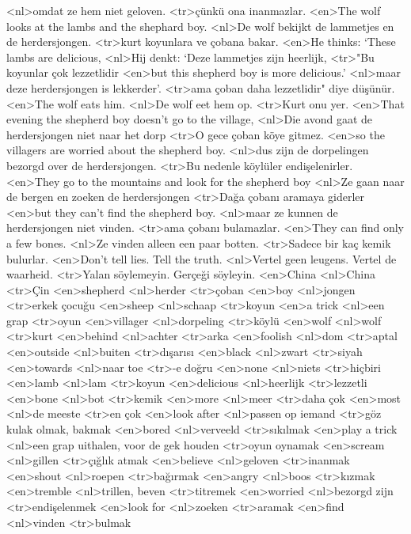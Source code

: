 <nl>omdat ze hem niet geloven.
<tr>çünkü ona inanmazlar.
<en>The wolf looks at the lambs and the shephard boy.
<nl>De wolf bekijkt de lammetjes en de herdersjongen. 
<tr>kurt koyunlara ve çobana bakar.
<en>He thinks: `These lambs are delicious,
<nl>Hij denkt: `Deze lammetjes zijn heerlijk, 
<tr>"Bu koyunlar çok lezzetlidir 
<en>but this shepherd boy is more delicious.'
<nl>maar deze herdersjongen is lekkerder'.
<tr>ama çoban daha lezzetlidir" diye düşünür.
<en>The wolf eats him.
<nl>De wolf eet hem op.
<tr>Kurt onu yer.
<en>That evening the shepherd boy doesn’t go to the village,
<nl>Die avond gaat de herdersjongen niet naar het dorp
<tr>O gece çoban köye gitmez.
<en>so  the villagers are worried about the shepherd boy.
<nl>dus zijn de dorpelingen bezorgd over de herdersjongen. 
<tr>Bu nedenle köylüler endişelenirler.
<en>They go to the mountains and look for the shepherd boy
<nl>Ze gaan naar de bergen en zoeken de herdersjongen 
<tr>Dağa çobanı aramaya giderler
<en>but they can’t find the shepherd boy.
<nl>maar ze kunnen de herdersjongen niet vinden.
<tr>ama çobanı bulamazlar.
<en>They can find only a few bones.
<nl>Ze vinden alleen een paar botten. 
<tr>Sadece bir kaç kemik bulurlar.
<en>Don’t tell lies. Tell the truth.
<nl>Vertel geen leugens. Vertel de waarheid.
<tr>Yalan söylemeyin. Gerçeği söyleyin.
<en>China
<nl>China
<tr>Çin
<en>shepherd
<nl>herder
<tr>çoban
<en>boy
<nl>jongen
<tr>erkek çocuğu
<en>sheep
<nl>schaap
<tr>koyun
<en>a trick
<nl>een grap
<tr>oyun
<en>villager
<nl>dorpeling
<tr>köylü
<en>wolf
<nl>wolf
<tr>kurt
<en>behind
<nl>achter
<tr>arka
<en>foolish
<nl>dom
<tr>aptal
<en>outside
<nl>buiten
<tr>dışarısı
<en>black
<nl>zwart
<tr>siyah
<en>towards
<nl>naar toe
<tr>-e doğru
<en>none
<nl>niets
<tr>hiçbiri
<en>lamb
<nl>lam
<tr>koyun
<en>delicious
<nl>heerlijk
<tr>lezzetli
<en>bone
<nl>bot
<tr>kemik
<en>more
<nl>meer
<tr>daha çok
<en>most
<nl>de meeste
<tr>en çok
<en>look after
<nl>passen op iemand
<tr>göz kulak olmak, bakmak
<en>bored
<nl>verveeld
<tr>sıkılmak
<en>play a trick
<nl>een grap uithalen, voor de gek houden
<tr>oyun oynamak
<en>scream
<nl>gillen
<tr>çığlık atmak
<en>believe
<nl>geloven
<tr>inanmak
<en>shout
<nl>roepen
<tr>bağırmak
<en>angry
<nl>boos
<tr>kızmak
<en>tremble
<nl>trillen, beven
<tr>titremek
<en>worried
<nl>bezorgd zijn
<tr>endişelenmek
<en>look for
<nl>zoeken
<tr>aramak
<en>find
<nl>vinden
<tr>bulmak
